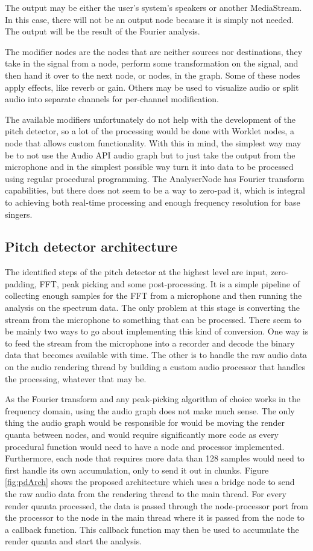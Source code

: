 The output may be either the user's system's speakers or another MediaStream. In this case, there will not be an output node because it is simply not needed. The output will be the result of the Fourier analysis.

The modifier nodes are the nodes that are neither sources nor destinations, they take in the signal from a node, perform some transformation on the signal, and then hand it over to the next node, or nodes, in the graph. Some of these nodes apply effects, like reverb or gain. Others may be used to visualize audio or split audio into separate channels for per-channel modification.

The available modifiers unfortunately do not help with the development of the pitch detector, so a lot of the processing would be done with Worklet nodes, a node that allows custom functionality. With this in mind, the simplest way may be to not use the Audio API audio graph but to just take the output from the microphone and in the simplest possible way turn it into data to be processed using regular procedural programming. The AnalyserNode has Fourier transform capabilities, but there does not seem to be a way to zero-pad it, which is integral to achieving both real-time processing and enough frequency resolution for base singers. 

\subsection{Pitch detector architecture}
The identified steps of the pitch detector at the highest level are input, zero-padding, FFT, peak picking and some post-processing. It is a simple pipeline of collecting enough samples for the FFT from a microphone and then running the analysis on the spectrum data. The only problem at this stage is converting the stream from the microphone to something that can be processed. There seem to be mainly two ways to go about implementing this kind of conversion. One way is to feed the stream from the microphone into a recorder and decode the binary data that becomes available with time. The other is to handle the raw audio data on the audio rendering thread by building a custom audio processor that handles the processing, whatever that may be. 

As the Fourier transform and any peak-picking algorithm of choice works in the frequency domain, using the audio graph does not make much sense. The only thing the audio graph would be responsible for would be moving the render quanta between nodes, and would require significantly more code as every procedural function would need to have a node and processor implemented. Furthermore, each node that requires more data than 128 samples would need to first handle its own accumulation, only to send it out in chunks. Figure \ref{fig:pdArch} shows the proposed architecture which uses a bridge node to send the raw audio data from the rendering thread to the main thread. For every render quanta processed, the data is passed through the node-processor port from the processor to the node in the main thread where it is passed from the node to a callback function. This callback function may then be used to accumulate the render quanta and start the analysis.

